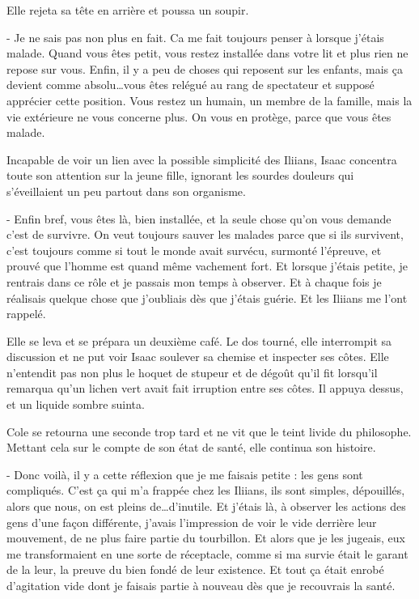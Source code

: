 \documentclass[12pt]{book}
\begin{document}
Elle rejeta sa tête en arrière et poussa un soupir.


-   Je ne sais pas non plus en fait. Ca me fait toujours penser à lorsque j’étais malade. Quand vous êtes petit, vous restez installée dans votre lit et plus rien ne repose sur vous. Enfin, il y a peu de choses qui reposent sur les enfants, mais ça devient comme absolu…vous êtes relégué au rang de spectateur et supposé apprécier cette position. Vous restez un humain, un membre de la famille, mais la vie extérieure ne vous concerne plus. On vous en protège, parce que vous êtes malade.


Incapable de voir un lien avec la possible simplicité des Iliians, Isaac concentra toute son attention sur la jeune fille, ignorant les sourdes douleurs qui s’éveillaient un peu partout dans son organisme.


-   Enfin bref, vous êtes là, bien installée, et la seule chose qu’on vous demande c’est de survivre. On veut toujours sauver les malades parce que si ils survivent, c’est toujours comme si tout le monde avait survécu, surmonté l’épreuve, et prouvé que l’homme est quand même vachement fort. Et lorsque j’étais petite, je rentrais dans ce rôle et je passais mon temps à observer. Et à chaque fois je réalisais quelque chose que j’oubliais dès que j’étais guérie. Et les Iliians me l’ont rappelé.


Elle se leva et se prépara un deuxième café. Le dos tourné, elle interrompit sa discussion et ne put voir Isaac soulever sa chemise et inspecter ses côtes. Elle n’entendit pas non plus le hoquet de stupeur et de dégoût qu’il fit lorsqu’il remarqua qu'un lichen vert avait fait irruption entre ses côtes. Il appuya dessus, et un liquide sombre suinta.


Cole se retourna une seconde trop tard et ne vit que le teint livide du philosophe. Mettant cela sur le compte de son état de santé, elle continua son histoire.


-  Donc voilà, il y a cette réflexion que je me faisais petite : les gens sont compliqués. C’est ça qui m’a frappée chez les Iliians, ils sont simples, dépouillés, alors que nous, on est pleins de…d’inutile. Et j’étais là, à observer les actions des gens d’une façon différente, j’avais l’impression de voir le vide derrière leur mouvement, de ne plus faire partie du tourbillon. Et alors que je les jugeais, eux me transformaient en une sorte de réceptacle, comme si ma survie était le garant de la leur, la preuve du bien fondé de leur existence. Et tout ça était enrobé d’agitation vide dont je faisais partie à nouveau dès que je recouvrais la santé.
\end{document}
